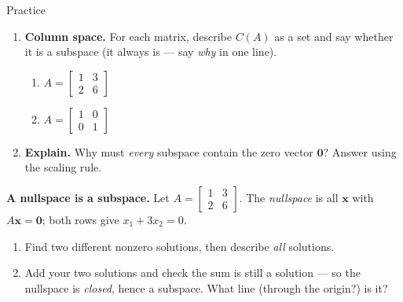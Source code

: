 \documentclass[10pt]{article}
\newcommand{\zero}{\mathbf{0}}
\begin{document}
\begin{notesbox}{Practice}
\begin{enumerate}[leftmargin=1.9em, itemsep=12pt]
\begin{enumerate}[label=(\alph*), leftmargin=1.8em, itemsep=6pt]
      \item all points on the line $y = 2x - 1$ \vspace{0.7cm}
      \item all $\begin{bmatrix} x \\ y \end{bmatrix}$ with $x = y$ \vspace{0.7cm}
      \item all $\begin{bmatrix} x \\ y \end{bmatrix}$ with $x + y = 1$ \vspace{0.7cm}
    \end{enumerate}
  \item \textbf{Column space.} For each matrix, describe $C(A)$ as a set and say whether it is a
        subspace (it always is --- say \emph{why} in one line).
    \begin{enumerate}[label=(\alph*), leftmargin=1.8em, itemsep=4pt]
      \item $A=\begin{bmatrix} 1 & 3 \\ 2 & 6 \end{bmatrix}$ \hfill
      \item $A=\begin{bmatrix} 1 & 0 \\ 0 & 1 \end{bmatrix}$
    \end{enumerate}
    \vspace{1.1cm}
  \item \textbf{Explain.} Why must \emph{every} subspace contain the zero vector $\zero$? Answer
        using the scaling rule. 
\end{enumerate}
\end{notesbox}

\begin{extensionbox}
\textbf{A nullspace is a subspace.} Let $A=\begin{bmatrix} 1 & 3 \\ 2 & 6 \end{bmatrix}$. The
\emph{nullspace} is all $\mathbf x$ with $A\mathbf x=\zero$; both rows give $x_1+3x_2=0$.
\begin{enumerate}[label=(\alph*), leftmargin=1.8em, itemsep=5pt]
  \item Find two different nonzero solutions, then describe \emph{all} solutions.
  \item Add your two solutions and check the sum is still a solution --- so the nullspace is
        \emph{closed}, hence a subspace. What line (through the origin?) is it?
\end{enumerate}
\end{extensionbox}
\end{document}
